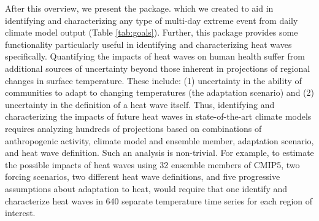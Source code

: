 After this overview, we present the  package. which
we created to aid in identifying and characterizing any type of
multi-day extreme event from daily climate model output (Table
\ref{tab:goals}). Further, this package provides some functionality
particularly useful in identifying and characterizing heat waves
specifically. Quantifying the impacts of heat waves on human health
suffer from additional sources of uncertainty beyond those inherent in
projections of regional changes in surface temperature. These include:
(1) uncertainty in the ability of communities to adapt to changing
temperatures (the adaptation scenario) and (2) uncertainty in the
definition of a heat wave itself. Thus, identifying and characterizing
the impacts of future heat waves in state-of-the-art climate models
requires analyzing hundreds of projections based on combinations of
anthropogenic activity, climate model and ensemble member, adaptation
scenario, and heat wave definition. Such an analysis is non-trivial. For
example, to estimate the possible impacts of heat waves using 32
ensemble members of CMIP5, two forcing scenarios, two different heat
wave definitions, and five progressive assumptions about adaptation to
heat, would require that one identify and characterize heat waves in 640
separate temperature time series for each region of interest.

